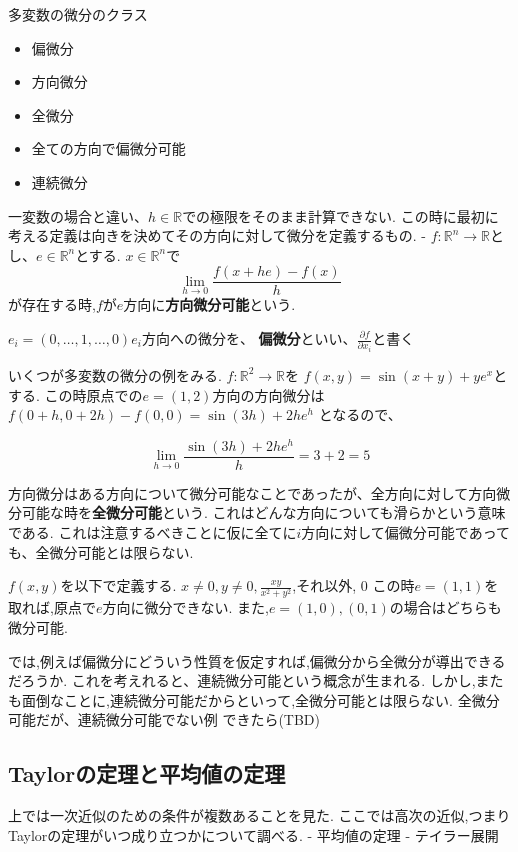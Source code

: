 \documentclass{ujarticle}
\begin{document}
多変数の微分のクラス
\begin{itemize}
\item 偏微分
\item 方向微分
\item 全微分
\item 全ての方向で偏微分可能
\item 連続微分
\end{itemize}

一変数の場合と違い、$h \in \mathbb{R}$での極限をそのまま計算できない.
この時に最初に考える定義は向きを決めてその方向に対して微分を定義するもの.
- $f:\mathbb{R}^n \to \mathbb{R}$とし、$e \in \mathbb{R}^n$とする.
$x \in \mathbb{R}^n$で
\begin{equation*}
  \lim_{h\to0}\frac{f(x + he) - f(x)}{h}
\end{equation*}
が存在する時,$f$が$e$方向に\textbf{方向微分可能}という.

$e_i = (0, \ldots, 1, \ldots, 0)$$e_i$方向への微分を、 \textbf{偏微分}といい、$\frac{\partial f}{\partial x_i}$と書く

いくつが多変数の微分の例をみる.
$f: \mathbb{R}^2 \to \mathbb{R}$を
$f(x, y) = \sin(x+y) + ye^x$とする.
この時原点での$e = (1 ,2)$方向の方向微分は
$f(0+h, 0+2h) - f(0, 0) = \sin(3h) + 2he^h$
となるので、

$$
\lim_{h \to 0} \frac{\sin(3h) + 2he^h }{h} = 3 + 2 = 5
$$

方向微分はある方向について微分可能なことであったが、全方向に対して方向微分可能な時を\textbf{全微分可能}という.
これはどんな方向についても滑らかという意味である.
これは注意するべきことに仮に全てに$i$方向に対して偏微分可能であっても、全微分可能とは限らない.


\begin{epl}
$f(x, y)$を以下で定義する.
$x \neq 0, y \neq 0,\frac{xy}{x^2 + y^2}$,それ以外, 0
この時$e = (1, 1)$を取れば,原点で$e$方向に微分できない.
また,$e = (1, 0), (0, 1)$の場合はどちらも微分可能.
\end{epl}

では,例えば偏微分にどういう性質を仮定すれば,偏微分から全微分が導出できるだろうか.
これを考えれると、連続微分可能という概念が生まれる.
しかし,またも面倒なことに,連続微分可能だからといって,全微分可能とは限らない.
全微分可能だが、連続微分可能でない例
できたら(TBD)


\subsection{Taylorの定理と平均値の定理}
上では一次近似のための条件が複数あることを見た.
ここでは高次の近似,つまりTaylorの定理がいつ成り立つかについて調べる.
- 平均値の定理
- テイラー展開
\end{document}
